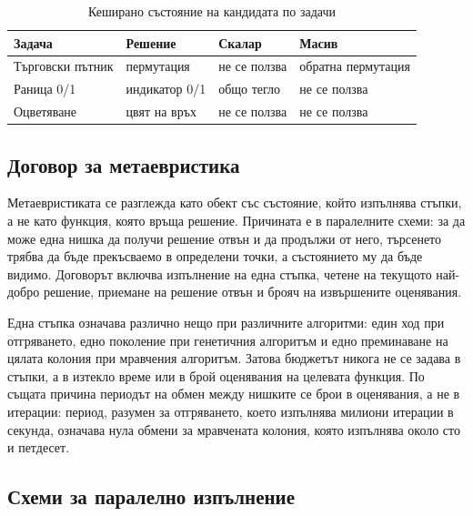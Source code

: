 \begin{table}[H]
\centering
\caption{Кеширано състояние на кандидата по задачи}
\label{tab:candidate-state}
\begin{adjustbox}{max width=\textwidth}
\begin{tabular}{@{}L{3.6cm}L{3.3cm}L{3.3cm}L{3.4cm}@{}}
\toprule
\textbf{Задача} & \textbf{Решение} & \textbf{Скалар} & \textbf{Масив} \\
\midrule
Търговски пътник & пермутация & не се ползва & обратна пермутация \\
Раница 0/1 & индикатор 0/1 & общо тегло & не се ползва \\
Оцветяване & цвят на връх & не се ползва & не се ползва \\
\bottomrule
\end{tabular}
\end{adjustbox}
\end{table}

\subsection{Договор за метаевристика}
\label{subsec:design-metaheuristic}

Метаевристиката се разглежда като обект със състояние, който изпълнява стъпки, а не
като функция, която връща решение. Причината е в паралелните схеми: за да може една
нишка да получи решение отвън и да продължи от него, търсенето трябва да бъде
прекъсваемо в определени точки, а състоянието му да бъде видимо. Договорът включва
изпълнение на една стъпка, четене на текущото най-добро решение, приемане на решение
отвън и брояч на извършените оценявания.

Една стъпка означава различно нещо при различните алгоритми: един ход при отгряването,
едно поколение при генетичния алгоритъм и едно преминаване на цялата колония при
мравчения алгоритъм. Затова бюджетът никога не се задава в стъпки, а в изтекло време
или в брой оценявания на целевата функция. По същата причина периодът на обмен между
нишките се брои в оценявания, а не в итерации: период, разумен за отгряването, което
изпълнява милиони итерации в секунда, означава нула обмени за мравчената колония,
която изпълнява около сто и петдесет.

\subsection{Схеми за паралелно изпълнение}
\label{subsec:design-parallel}

